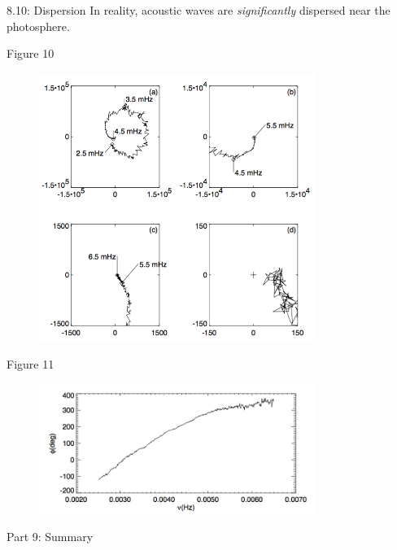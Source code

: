 \documentclass{beamer}
\begin{document}
\begin{frame}{8.10: Dispersion}
    In reality, acoustic waves are \emph{significantly} dispersed
    near the photosphere.
\end{frame}

\begin{frame}{8.9}
\end{frame}

\begin{frame}{8.11}
\end{frame}

\begin{frame}{8.12}
\end{frame}

\begin{frame}{8.13}
\end{frame}

\begin{frame}{8.14}
\end{frame}



\begin{frame}{Figure 10}
    \begin{figure}
        \includegraphics[width=0.8\textwidth]{fig_10.png}
    \end{figure}
\end{frame}

\begin{frame}{Figure 11}
    \begin{figure}
        \includegraphics[width=0.8\textwidth]{fig_11.png}
    \end{figure}
\end{frame}

\begin{frame}{Part 9: Summary}
\end{frame}

\end{document}
